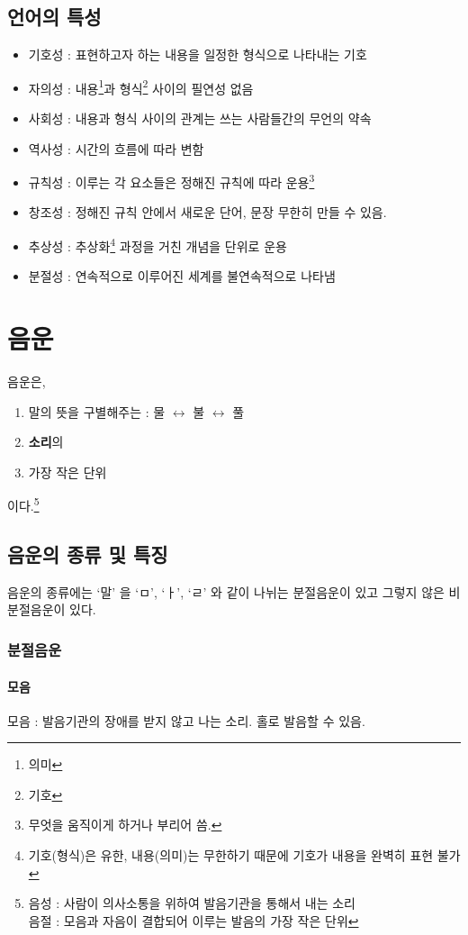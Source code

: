 \documentclass[10pt]{report}
\begin{document}
\section{언어의 특성}
\begin{itemize}
\item 기호성 : 표현하고자 하는 내용을 일정한 형식으로 나타내는 기호
\item 자의성 : 내용\footnote{의미}과 형식\footnote{기호} 사이의 필연성 없음
\item 사회성 : 내용과 형식 사이의 관계는 쓰는 사람들간의 무언의 약속
\item 역사성 : 시간의 흐름에 따라 변함
\item 규칙성 : 이루는 각 요소들은 정해진 규칙에 따라 운용\footnote{무엇을 움직이게 하거나 부리어 씀.}
\item 창조성 : 정해진 규칙 안에서 새로운 단어, 문장 무한히 만들 수 있음.
\item 추상성 : 추상화\footnote{기호(형식)은 유한, 내용(의미)는 무한하기 때문에 기호가 내용을 완벽히 표현 불가} 과정을 거친 개념을 단위로 운용
\item 분절성 : 연속적으로 이루어진 세계를 불연속적으로 나타냄

\end{itemize}
\chapter{음운}
음운은, 
\begin{enumerate}
\item 말의 뜻을 구별해주는 : 물 $\leftrightarrow$ 불 $\leftrightarrow$ 풀
\item \textbf{소리}의
\item 가장 작은 단위
\end{enumerate}
이다.\footnote{음성 : 사람이 의사소통을 위하여 발음기관을 통해서 내는 소리 \\ 음절 : 모음과 자음이 결합되어 이루는 발음의 가장 작은 단위}

\section{음운의 종류 및 특징}
음운의 종류에는 `말' 을 `ㅁ', `ㅏ', `ㄹ' 와 같이 나뉘는 분절음운이 있고 그렇지 않은 비분절음운이 있다.
\subsection{분절음운}
\subsubsection{모음}
\begin{center}
모음 : 발음기관의 장애를 받지 않고 나는 소리. 홀로 발음할 수 있음.
\end{center}
\end{document}
